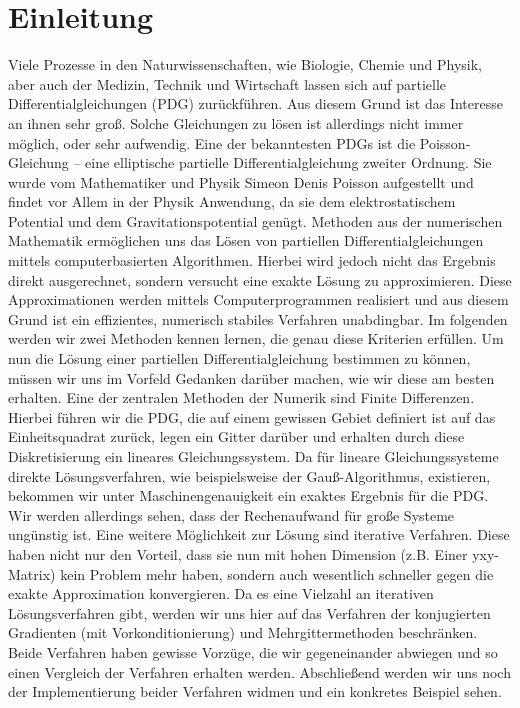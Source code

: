\chapter{Einleitung}\label{c.Einleitung}

Viele Prozesse in den Naturwissenschaften, wie Biologie, Chemie und Physik, aber auch der Medizin, Technik und Wirtschaft lassen sich auf partielle Differentialgleichungen (PDG) zurückführen. Aus diesem Grund ist das Interesse an ihnen sehr groß. Solche Gleichungen zu lösen ist allerdings nicht immer möglich, oder sehr aufwendig.
Eine der bekanntesten PDGs ist die Poisson-Gleichung – eine elliptische partielle Differentialgleichung zweiter Ordnung. Sie wurde vom Mathematiker und Physik Simeon Denis Poisson aufgestellt und findet vor Allem in der Physik Anwendung, da sie dem elektrostatischem Potential und dem Gravitationspotential genügt.
Methoden aus der numerischen Mathematik ermöglichen uns das Lösen von partiellen Differentialgleichungen mittels computerbasierten Algorithmen. Hierbei wird jedoch nicht das Ergebnis direkt ausgerechnet, sondern versucht eine exakte Lösung zu approximieren. Diese Approximationen werden mittels Computerprogrammen realisiert und aus diesem Grund ist ein effizientes, numerisch stabiles Verfahren unabdingbar. Im folgenden werden wir zwei Methoden kennen lernen, die genau diese Kriterien erfüllen.
Um nun die Lösung einer partiellen Differentialgleichung bestimmen zu können, müssen wir uns im Vorfeld Gedanken darüber machen, wie wir diese am besten erhalten. Eine der zentralen Methoden der Numerik sind Finite Differenzen. Hierbei führen wir die PDG, die auf einem gewissen Gebiet definiert ist auf das Einheitsquadrat zurück, legen ein Gitter darüber und erhalten durch diese Diskretisierung ein lineares Gleichungssystem.
Da für lineare Gleichungssysteme direkte Lösungsverfahren, wie beispielsweise der Gauß-Algorithmus, existieren, bekommen wir unter Maschinengenauigkeit ein exaktes Ergebnis für die PDG. Wir werden allerdings sehen, dass der Rechenaufwand für große Systeme ungünstig ist.
Eine weitere Möglichkeit zur Lösung sind iterative Verfahren. Diese haben nicht nur den Vorteil, dass sie nun mit hohen Dimension (z.B. Einer yxy-Matrix) kein Problem mehr haben, sondern auch wesentlich schneller gegen die exakte Approximation konvergieren.
Da es eine Vielzahl an iterativen Lösungsverfahren gibt, werden wir uns hier auf das Verfahren der konjugierten Gradienten (mit Vorkonditionierung) und Mehrgittermethoden beschränken. Beide Verfahren haben gewisse Vorzüge, die wir gegeneinander abwiegen und so einen Vergleich der Verfahren erhalten werden. Abschließend werden wir uns noch der Implementierung beider Verfahren widmen und ein konkretes Beispiel sehen.



